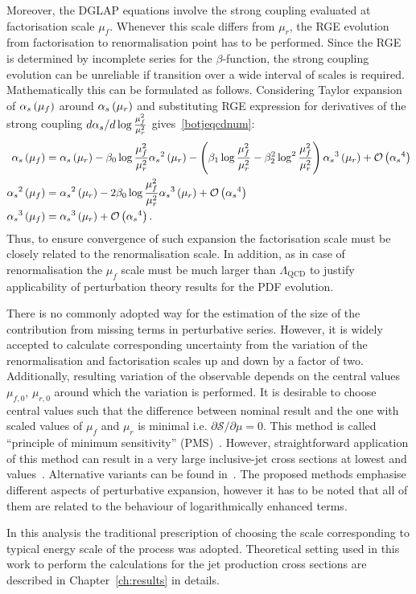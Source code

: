 Moreover, the DGLAP equations involve the strong coupling evaluated at factorisation scale $\mu_f$. Whenever this scale differs from $\mu_r$, the RGE evolution from factorisation to renormalisation point has to be performed. Since the RGE is determined by incomplete series for the $\beta$-function, the strong coupling evolution can be unreliable if transition over a wide interval of scales is required. Mathematically this can be formulated as follows. Considering Taylor expansion of $\mbox{$\alpha_{s}$}\left(\mu_f\right)$ around $\mbox{$\alpha_{s}$}\left(\mu_r\right)$ and substituting RGE expression for derivatives of the strong coupling $d\mbox{$\alpha_{s}$}/d\log{\frac{\mu_f^2}{\mu_r^2}}$ gives~\ref{botjeqcdnum}:
{\small
\begin{align}
 \mbox{$\alpha_{s}$}\left(\mu_f\right) &= \mbox{$\alpha_{s}$}\left(\mu_r\right) - \beta_0\log{\frac{\mu_f^2}{\mu_r^2}}\mbox{$\alpha_{s}$}^2\left(\mu_r\right) - \left(\beta_1\log{\frac{\mu_f^2}{\mu_r^2}} - \beta_2^2\log^2{\frac{\mu_f^2}{\mu_r^2}}\right)\mbox{$\alpha_{s}$}^3\left(\mu_r\right) + \mathcal{O}\left(\mbox{$\alpha_{s}$}^4\right)\\ \nonumber
 \mbox{$\alpha_{s}$}^2\left(\mu_f\right) & = \mbox{$\alpha_{s}$}^2\left(\mu_r\right) - 2\beta_0\log{\frac{\mu_f^2}{\mu_r^2}}\mbox{$\alpha_{s}$}^3\left(\mu_r\right) + \mathcal{O}\left(\mbox{$\alpha_{s}$}^4\right)\\
\mbox{$\alpha_{s}$}^3\left(\mu_f\right) & = \mbox{$\alpha_{s}$}^3\left(\mu_r\right) + \mathcal{O}\left(\mbox{$\alpha_{s}$}^4\right).
\end{align}
}
Thus, to ensure convergence of such expansion the factorisation scale must be closely related to the renormalisation scale. In addition, as in case of renormalisation the $\mu_f$ scale must be much larger than $\Lambda_\mathrm{QCD}$ to justify applicability of perturbation theory results for the PDF evolution.

There is no commonly adopted way for the estimation of the size of the contribution from missing terms in perturbative series. However, it is widely accepted to calculate corresponding uncertainty from the variation of the renormalisation and factorisation scales up and down by a factor of two. Additionally, resulting variation of the observable depends on the central values $\mu_{f,0},\,\mu_{r,0}$ around which the variation is performed. It is desirable to choose central values such that the difference between nominal result and the one with scaled values of $\mu_f$ and $\mu_r$ is minimal i.e. $\partial\mathcal{S}/\partial\mu=0$. This method is called ``principle of minimum sensitivity'' (PMS)~\cite{pmsprinciple}. However, straightforward application of this method can result in a very large inclusive-jet cross sections at lowest \qsq and \etjet values~\cite{britzer}. Alternative variants can be found in~\cite{ioffelipatovfadin}. The proposed methods emphasise different aspects of perturbative expansion, however it has to be noted that all of them are related to the behaviour of logarithmically enhanced terms.

In this analysis the traditional prescription of choosing the scale corresponding to typical energy scale of the process was adopted. Theoretical setting used in this work to perform the calculations for the jet production cross sections are described in Chapter~\ref{ch:results} in details.
